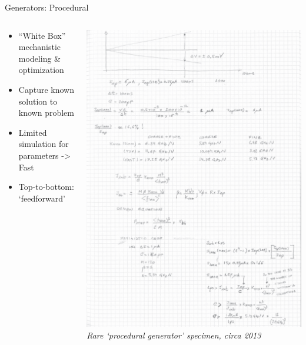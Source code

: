 \begin{frame}{Generators: Procedural}
\protect\hypertarget{generators-procedural}{}
\begin{columns}[T]
\begin{column}{0.48\textwidth}
\begin{itemize}
\tightlist
\item
  ``White Box'' mechanistic modeling \& optimization
\item
  Capture known solution to known problem
\item
  Limited simulation for parameters -\textgreater{} Fast
\item
  Top-to-bottom: `feedforward'
\end{itemize}
\end{column}

\begin{column}{0.48\textwidth}
\includegraphics{../images/IMG_1500.jpeg} \emph{Rare `procedural
generator' specimen, circa 2013}
\end{column}
\end{columns}
\end{frame}

